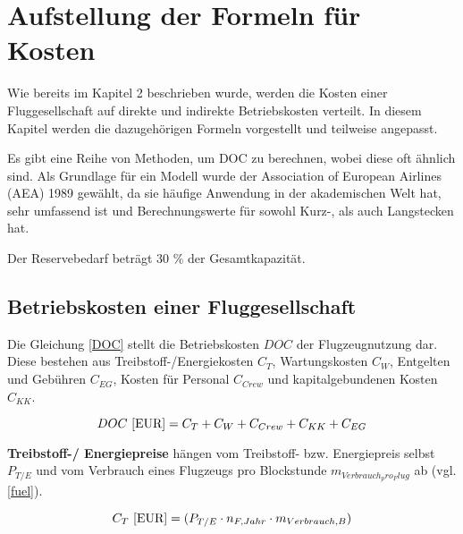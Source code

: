 \section{Aufstellung der Formeln für Kosten}
\label{s:Aufstellung der Formeln für Kosten}

Wie bereits im Kapitel 2 beschrieben wurde, werden die Kosten einer Fluggesellschaft auf direkte und indirekte Betriebskosten verteilt.
In diesem Kapitel werden die dazugehörigen Formeln vorgestellt und teilweise angepasst. 

Es gibt eine Reihe von Methoden, um DOC zu berechnen, wobei diese oft ähnlich sind.
Als Grundlage für ein Modell wurde %
der Association of European Airlines (AEA) 1989 gewählt, da sie häufige Anwendung in der akademischen Welt hat,
sehr umfassend ist und Berechnungswerte für sowohl Kurz-, als auch Langstecken hat.

Der Reservebedarf beträgt 30 \% der Gesamtkapazität.



\subsection{Betriebskosten einer Fluggesellschaft}

Die Gleichung \eqref{DOC} stellt die Betriebskosten $DOC$ der Flugzeugnutzung dar. Diese bestehen aus Treibstoff-/Energiekosten $C_T$, 
Wartungskosten $C_W$, Entgelten und Gebühren $C_{EG}$, Kosten für Personal $C_{Crew}$ und kapitalgebundenen Kosten $C_{KK}$.


\begin{equation}
     {DOC ~[\text{EUR}]} = C_T + C_W + C_{Crew} + C_{KK} + C_{EG} \\
     \label{DOC}
  \end{equation}

\textbf{Treibstoff-/ Energiepreise} hängen vom Treibstoff- bzw. Energiepreis selbst \\ $P_{T/E}$ und vom Verbrauch 
eines Flugzeugs pro Blockstunde $m_{Verbrauch_pro_Flug}$ ab (vgl. \eqref{fuel}).



\begin{equation}
   {C_T ~[\text{EUR}]} = (P_{T/E} \cdot n_{F,Jahr} \cdot m_{Verbrauch,B}) \\
   \label{fuel}
\end{equation}

